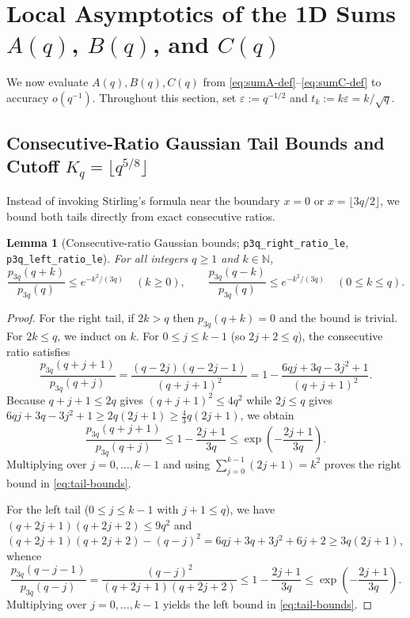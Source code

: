 \documentclass[11pt,a4paper]{article}
\numberwithin{equation}{section}
\theoremstyle{plain}
\newtheorem{lemma}[theorem]{Lemma}
\theoremstyle{definition}
\theoremstyle{remark}
\newcommand{\N}{\mathbb{N}}
\newcommand{\code}[1]{\texttt{\small #1}}
\begin{document}
\section{Local Asymptotics of the 1D Sums \texorpdfstring{$A(q)$, $B(q)$, and $C(q)$}{A(q), B(q), and C(q)}}
\label{sec:local}

We now evaluate $A(q),B(q),C(q)$ from \eqref{eq:sumA-def}--\eqref{eq:sumC-def} to accuracy $o(q^{-1})$. Throughout this section, set $\varepsilon := q^{-1/2}$ and $t_k := k\varepsilon = k/\sqrt{q}$.

\subsection{Consecutive-Ratio Gaussian Tail Bounds and Cutoff \texorpdfstring{$K_q=\lfloor q^{5/8}\rfloor$}{Kq}}

Instead of invoking Stirling's formula near the boundary $x=0$ or $x=\lfloor 3q/2\rfloor$, we bound both tails directly from exact consecutive ratios.

\begin{lemma}[Consecutive-ratio Gaussian bounds; \code{p3q\_right\_ratio\_le}, \code{p3q\_left\_ratio\_le}]
\label{lem:tail-ratios}
For all integers $q\ge 1$ and $k\in\N$,
\begin{equation}\label{eq:tail-bounds}
  \frac{p_{3q}(q+k)}{p_{3q}(q)} \le e^{-k^2/(3q)} \quad (k\ge 0),
  \qquad
  \frac{p_{3q}(q-k)}{p_{3q}(q)} \le e^{-k^2/(3q)} \quad (0\le k\le q).
\end{equation}
\end{lemma}

\begin{proof}
For the right tail, if $2k>q$ then $p_{3q}(q+k)=0$ and the bound is trivial. For $2k\le q$, we induct on $k$. For $0\le j\le k-1$ (so $2j+2\le q$), the consecutive ratio satisfies
\[
  \frac{p_{3q}(q+j+1)}{p_{3q}(q+j)}
  = \frac{(q-2j)(q-2j-1)}{(q+j+1)^2}
  = 1 - \frac{6qj + 3q - 3j^2 + 1}{(q+j+1)^2}.
\]
Because $q+j+1\le 2q$ gives $(q+j+1)^2\le 4q^2$ while $2j\le q$ gives $6qj+3q-3j^2+1 \ge 2q(2j+1) \ge \frac{4}{3}q(2j+1)$, we obtain
\[
  \frac{p_{3q}(q+j+1)}{p_{3q}(q+j)}
  \le 1 - \frac{2j+1}{3q}
  \le \exp\!\left(-\frac{2j+1}{3q}\right).
\]
Multiplying over $j=0,\dots,k-1$ and using $\sum_{j=0}^{k-1}(2j+1)=k^2$ proves the right bound in \eqref{eq:tail-bounds}.

For the left tail ($0\le j\le k-1$ with $j+1\le q$), we have $(q+2j+1)(q+2j+2)\le 9q^2$ and $(q+2j+1)(q+2j+2)-(q-j)^2 = 6qj+3q+3j^2+6j+2 \ge 3q(2j+1)$, whence
\[
  \frac{p_{3q}(q-j-1)}{p_{3q}(q-j)}
  = \frac{(q-j)^2}{(q+2j+1)(q+2j+2)}
  \le 1 - \frac{2j+1}{3q}
  \le \exp\!\left(-\frac{2j+1}{3q}\right).
\]
Multiplying over $j=0,\dots,k-1$ yields the left bound in \eqref{eq:tail-bounds}.
\end{proof}
\end{document}
